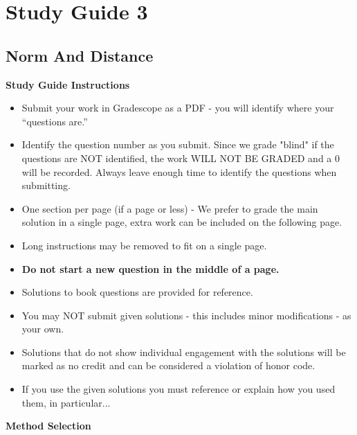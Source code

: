 \clearpage
\chapter{Study Guide 3}

\section{Norm And Distance}

\begin{center}
    \large{\textbf{Study Guide Instructions}}
\end{center}


\begin{itemize}
    \item Submit your work in Gradescope as a PDF - you will identify where your “questions are.”
    \item Identify the question number as you submit.  Since we grade "blind" if the questions are NOT identified, the work WILL NOT BE GRADED and a 0 will be recorded. Always leave enough time to 
    identify the questions when submitting.
    \item One section per page (if a page or less) - We prefer to grade the main solution in a single page, extra work can be included on the following page.
    \item Long instructions may be removed to fit on a single page.
    \item \textbf{Do not start a new question in the middle of a page.}
    \item Solutions to book questions are provided for reference.
    \item You may NOT submit given solutions - this includes minor modifications - as your own.
    \item Solutions that do not show individual engagement with the solutions will be marked as no credit and can be considered a violation of honor code.
    \item If you use the given solutions you must reference or explain how you used them, in particular...
\end{itemize}


\begin{center}
    \large{\textbf{Method Selection}}
\end{center}


